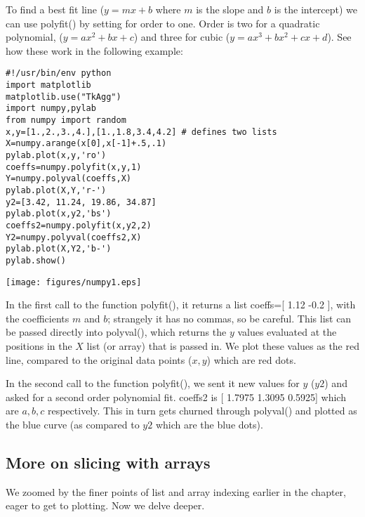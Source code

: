 {To find a best fit line ($y=mx+b$ where $m$ is the slope and $b$ is the intercept) we can  use {\color{blue}polyfit()} by setting  for {\color{blue}order} to one.  Order is two for  a quadratic polynomial, ($y=ax^2+bx+c$) and three for cubic  ($y=ax^3+bx^2+cx+d$).  See how these work in the following example: 


{\singlespacing \color{blue} \begin{verbatim}
#!/usr/bin/env python
import matplotlib
matplotlib.use("TkAgg")
import numpy,pylab
from numpy import random
x,y=[1.,2.,3.,4.],[1.,1.8,3.4,4.2] # defines two lists
X=numpy.arange(x[0],x[-1]+.5,.1)
pylab.plot(x,y,'ro')
coeffs=numpy.polyfit(x,y,1)
Y=numpy.polyval(coeffs,X)
pylab.plot(X,Y,'r-')
y2=[3.42, 11.24, 19.86, 34.87]
pylab.plot(x,y2,'bs')
coeffs2=numpy.polyfit(x,y2,2)
Y2=numpy.polyval(coeffs2,X)
pylab.plot(X,Y2,'b-')
pylab.show()
\end{verbatim}}

\texttt{[image: figures/numpy1.eps]}

\noindent
In the first call to the  function {\color{blue}polyfit()}, it returns a list {\color{blue}coeffs=[ 1.12 -0.2 ]}, with the coefficients $m$ and $b$;  strangely  it has no commas, so be careful.  This list can be passed directly into  {\color{blue}polyval()}, which returns the $y$ values evaluated at the positions in the $X$ list (or array) that is passed in.  We plot these values as the red line, compared to the original data points ($x,y$) which are red dots.   

In the second call to the function {\color{blue}polyfit()}, we sent it new values for $y$ ($y2$) and asked for a second order polynomial fit.  {\color{blue}coeffs2} is   [ 1.7975  1.3095  0.5925] which are $a,b, c$  respectively.   This in turn gets churned through {\color{blue}polyval()} and plotted as the blue curve (as compared to $y2$ which are the blue dots).  


\subsection {More on slicing with arrays}

 We zoomed by the finer points of list and array indexing earlier in the chapter, eager to get to plotting.  Now we delve deeper.

}

